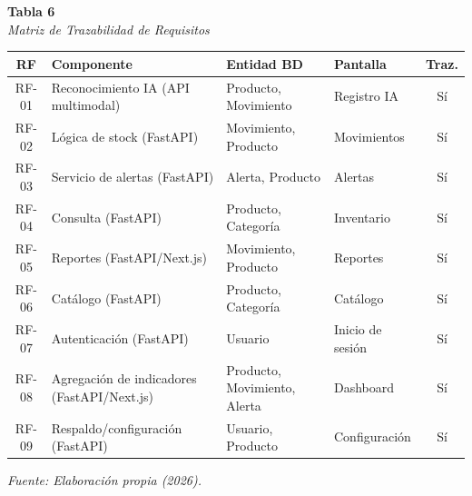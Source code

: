 \documentclass[12pt, letterpaper]{report}
\begin{document}
\vspace{6pt}
\scriptsize
{}%
\noindent\normalsize\textbf{Tabla 6}\scriptsize\\
\textit{Matriz de Trazabilidad de Requisitos}
\vspace{4pt}

\begin{center}
\begin{tabular}{|c|>{\raggedright\arraybackslash}p{3.0cm}
                  |>{\raggedright\arraybackslash}p{2.6cm}
                  |>{\raggedright\arraybackslash}p{2.6cm}|c|}
\hline
\textbf{RF} & \textbf{Componente} & \textbf{Entidad BD} &
\textbf{Pantalla} & \textbf{Traz.} \\
\hline
RF-01 & Reconocimiento IA (API multimodal) & Producto, Movimiento &
Registro IA & Sí \\
\hline
RF-02 & Lógica de stock (FastAPI) & Movimiento, Producto &
Movimientos & Sí \\
\hline
RF-03 & Servicio de alertas (FastAPI) & Alerta, Producto & Alertas &
Sí \\
\hline
RF-04 & Consulta (FastAPI) & Producto, Categoría & Inventario & Sí \\
\hline
RF-05 & Reportes (FastAPI/Next.js) & Movimiento, Producto & Reportes &
Sí \\
\hline
RF-06 & Catálogo (FastAPI) & Producto, Categoría & Catálogo & Sí \\
\hline
RF-07 & Autenticación (FastAPI) & Usuario & Inicio de sesión & Sí \\
\hline
RF-08 & Agregación de indicadores (FastAPI/Next.js) & Producto,
Movimiento, Alerta & Dashboard & Sí \\
\hline
RF-09 & Respaldo/configuración (FastAPI) & Usuario, Producto &
Configuración & Sí \\
\hline
\end{tabular}
\end{center}
\vspace{2pt}
\noindent\small\textit{Fuente: Elaboración propia (2026).}\normalsize
{}

\vspace{6pt}
\end{document}
